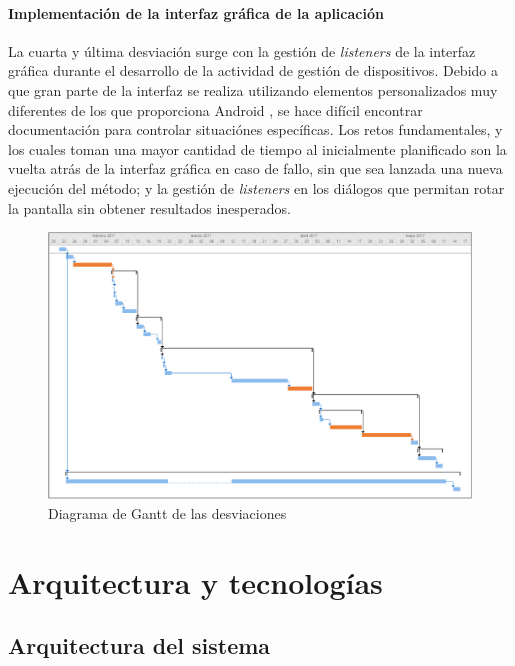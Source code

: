 \documentclass[12pt, twoside]{article}
\begin{document}
        \paragraph{ Implementación de la interfaz gráfica de la aplicación}
        La cuarta y última desviación surge con la gestión de \textit{listeners} de la interfaz gráfica durante el desarrollo de la actividad de gestión de dispositivos. Debido a que gran parte de la interfaz se realiza utilizando elementos personalizados muy diferentes de los que proporciona Android \cite{Color}, se hace difícil encontrar documentación para controlar situaciónes específicas. Los retos fundamentales, y los cuales toman una mayor cantidad de tiempo al inicialmente planificado son la vuelta atrás de la interfaz gráfica en caso de fallo, sin que sea lanzada una nueva ejecución del método; y la gestión de \textit{listeners} en los diálogos que permitan rotar la pantalla sin obtener resultados inesperados.
        
        \begin{figure}[h!]
            \centering
                \includegraphics[scale=0.7]{deviations_gantt.eps}
                \caption{Diagrama de Gantt de las desviaciones}
                \label{fig:deviations_gantt}
        \end{figure}

\cleardoublepage \section{Arquitectura y tecnologías} \label{sec:arq}

    \subsection{Arquitectura del sistema}
\end{document}
